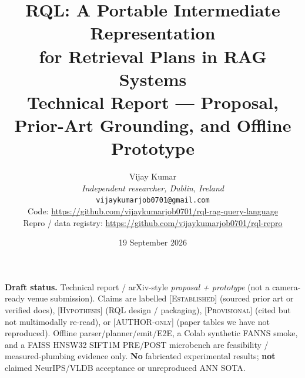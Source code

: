 \documentclass[11pt,a4paper]{article}
\title{\textbf{RQL: A Portable Intermediate Representation\\
for Retrieval Plans in RAG Systems}\\[0.4em]
\large Technical Report --- Proposal, Prior-Art Grounding, and Offline Prototype}
\author{Vijay Kumar\\
\textit{Independent researcher, Dublin, Ireland}\\
\texttt{vijaykumarjob0701@gmail.com}\\[0.4em]
\small Code: \url{https://github.com/vijaykumarjob0701/rql-rag-query-language}\\
\small Repro / data registry: \url{https://github.com/vijaykumarjob0701/rql-repro}}
\date{19 September 2026}
\newcommand{\established}{\textcolor{green!40!black}{\textsc{[Established]}}}
\newcommand{\hypothesis}{\textcolor{orange!70!black}{\textsc{[Hypothesis]}}}
\newcommand{\provisional}{\textcolor{purple!60!black}{\textsc{[Provisional]}}}
\newcommand{\authoronly}{\textcolor{red!50!black}{\textsc{[AUTHOR-only]}}}
\begin{document}
\maketitle

\begin{center}
\small
\textbf{Draft status.} Technical report / arXiv-style \emph{proposal + prototype}
(not a camera-ready venue submission).
Claims are labelled \established{} (sourced prior art or verified docs),
\hypothesis{} (RQL design / packaging),
\provisional{} (cited but not multimodally re-read),
or \authoronly{} (paper tables we have not reproduced).
Offline parser/planner/emit/E2E, a Colab synthetic FANNS smoke, and a FAISS HNSW32
SIFT1M PRE/POST microbench are feasibility / measured-plumbing evidence only.
\textbf{No} fabricated experimental results; \textbf{not} claimed NeurIPS/VLDB acceptance or unreproduced ANN SOTA.
\end{center}













\appendix




\end{document}
